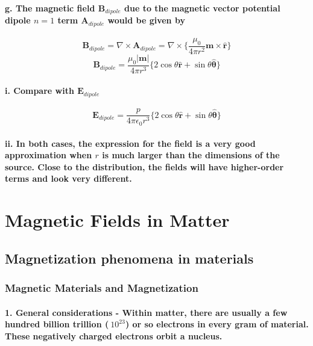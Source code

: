 \documentclass{article}
\begin{document}
\paragraph{\indent g. The magnetic field $\boldsymbol{B}_{dipole}$ due to the magnetic vector potential dipole $n=1$ term $\boldsymbol{A}_{dipole}$ would be given by}
\begin{equation*}
    \boldsymbol{B}_{dipole}=\nabla\times\boldsymbol{A}_{dipole}=\nabla\times\{ \frac{\mu_0}{4\pi r^2}\boldsymbol{m}\times\hat{\boldsymbol{r}}\}
\end{equation*}
\begin{equation*}
    \boldsymbol{B}_{dipole}=\frac{\mu_0|\boldsymbol{m}|}{4\pi r^3}\{ 2\cos\theta\hat{\boldsymbol{r}}+\sin\theta\hat{\boldsymbol{\theta}}\}
\end{equation*}
\paragraph{\indent\indent i. Compare with $\boldsymbol{E}_{dipole}$}
\begin{equation*}
    \boldsymbol{E}_{dipole}=\frac{p}{4\pi\epsilon_0 r^3}\{2\cos\theta\hat{\boldsymbol{r}}+\sin\theta\hat{\boldsymbol{\theta}}\}
\end{equation*}
\paragraph{\indent\indent ii. In both cases, the expression for the field is a very good approximation when $r$ is much larger than the dimensions of the source. Close to the distribution, the fields will have higher-order terms and look very different.}
\section{Magnetic Fields in Matter}
\subsection{Magnetization phenomena in materials}
\subsubsection{Magnetic Materials and Magnetization}
\paragraph{1. General considerations - Within matter, there are usually a few hundred billion trillion ($~10^{23}$) or so electrons in every gram of material. These negatively charged electrons orbit a nucleus.}
\end{document}
